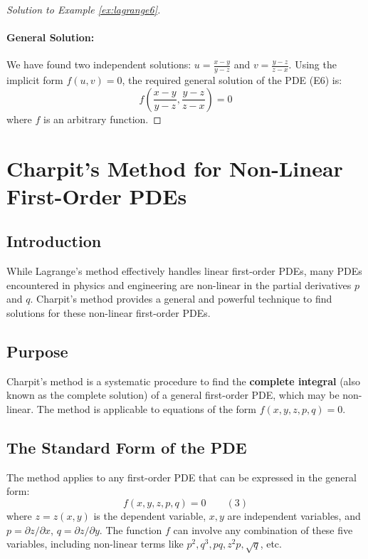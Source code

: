 \documentclass{article}
\theoremstyle{remark}
\begin{document}
\begin{proof}[Solution to Example \ref{ex:lagrange6}]
		\paragraph{General Solution:}
		We have found two independent solutions: $u = \frac{x-y}{y-z}$ and $v = \frac{y-z}{z-x}$.
		Using the implicit form $f(u, v) = 0$, the required general solution of the PDE (E6) is:
		\[ f \left( \frac{x-y}{y-z}, \frac{y-z}{z-x} \right) = 0 \]
		where $f$ is an arbitrary function.
	\end{proof}
	
	\newpage %
	
	\section{Charpit's Method for Non-Linear First-Order PDEs}
	\label{sec:charpit}
	
	\subsection{Introduction}
	While Lagrange's method effectively handles linear first-order PDEs, many PDEs encountered in physics and engineering are non-linear in the partial derivatives $p$ and $q$. Charpit's method provides a general and powerful technique to find solutions for these non-linear first-order PDEs.
	
	\subsection{Purpose}
	Charpit's method is a systematic procedure to find the \textbf{complete integral} (also known as the complete solution) of a general first-order PDE, which may be non-linear. The method is applicable to equations of the form $f(x, y, z, p, q) = 0$.
	
	\subsection{The Standard Form of the PDE}
	The method applies to any first-order PDE that can be expressed in the general form:
	\begin{equation*}
		f(x, y, z, p, q) = 0 \quad \quad (3)
	\end{equation*}
	where $z=z(x,y)$ is the dependent variable, $x, y$ are independent variables, and $p = \partial z/\partial x$, $q = \partial z/\partial y$. The function $f$ can involve any combination of these five variables, including non-linear terms like $p^2, q^3, pq, z^2p, \sqrt{q}$, etc.
	
\end{document}

